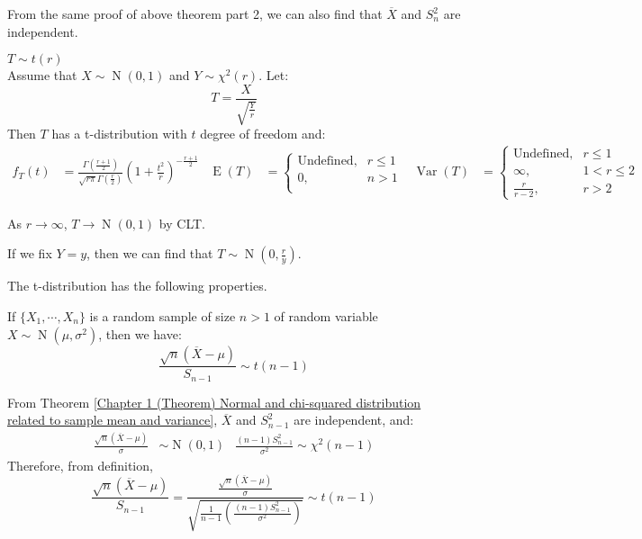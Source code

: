 \documentclass{huhtakm-template-book-v2}
\DeclareMathOperator{\E}{E}
\DeclareMathOperator{\Var}{Var}
\DeclareMathOperator{\N}{N}
\begin{document}
\begin{rem}
	From the same proof of above theorem part 2, we can also find that $\overline{X}$ and $S_{n}^{2}$ are independent.
\end{rem}
\begin{eg} $T\sim t(r)$\\
	Assume that $X\sim\N(0,1)$ and $Y\sim\chi^{2}(r)$. Let:
	\begin{equation*}
		T=\frac{X}{\sqrt{\frac{Y}{r}}}
	\end{equation*}
	Then $T$ has a t-distribution with $t$ degree of freedom and:
	\begin{align*}
		f_{T}(t)&=\frac{\Gamma\left(\frac{r+1}{2}\right)}{\sqrt{r\pi}\Gamma\left(\frac{r}{2}\right)}\left(1+\frac{t^{2}}{r}\right)^{-\frac{r+1}{2}} & \E(T)&=\begin{cases}
			\text{Undefined}, &r\leq 1\\
			0, &n>1\\
		\end{cases} & \Var(T)&=\begin{cases}
			\text{Undefined}, &r\leq 1\\
			\infty, &1<r\leq 2\\
			\frac{r}{r-2}, &r>2
		\end{cases}
	\end{align*}
\end{eg}
\begin{rem}
	As $r\to\infty$, $T\to\N(0,1)$ by CLT.
\end{rem}
\begin{rem}
	If we fix $Y=y$, then we can find that $T\sim\N(0,\frac{r}{y})$.
\end{rem}
The t-distribution has the following properties.
\begin{thm}
	If $\{X_{1},\cdots,X_{n}\}$ is a random sample of size $n>1$ of random variable $X\sim\N(\mu,\sigma^{2})$, then we have:
	\begin{equation*}
		\frac{\sqrt{n}(\overline{X}-\mu)}{S_{n-1}}\sim t(n-1)
	\end{equation*}
\end{thm}
\begin{proofing}
	From Theorem \ref{Chapter 1 (Theorem) Normal and chi-squared distribution related to sample mean and variance}, $\overline{X}$ and $S_{n-1}^{2}$ are independent, and:
	\begin{align*}
		\frac{\sqrt{n}(\overline{X}-\mu)}{\sigma}&\sim\N(0,1) & \frac{(n-1)S_{n-1}^{2}}{\sigma^{2}}\sim\chi^{2}(n-1)
	\end{align*}
	Therefore, from definition,
	\begin{equation*}
		\frac{\sqrt{n}(\overline{X}-\mu)}{S_{n-1}}=\frac{\frac{\sqrt{n}(\overline{X}-\mu)}{\sigma}}{\sqrt{\frac{1}{n-1}\left(\frac{(n-1)S_{n-1}^{2}}{\sigma^{2}}\right)}}\sim t(n-1)
	\end{equation*}
\end{proofing}
\end{document}
